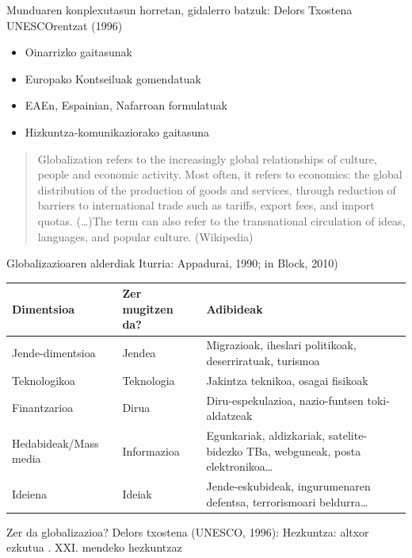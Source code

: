 \documentclass[
]{book}
\providecommand{\tightlist}{%
  \setlength{\itemsep}{0pt}\setlength{\parskip}{0pt}}
\begin{document}
Munduaren konplexutasun horretan, gidalerro batzuk: Delors Txostena UNESCOrentzat (1996)

\begin{itemize}
\tightlist
\item
  Oinarrizko gaitasunak
\item
  Europako Kontseiluak gomendatuak
\item
  EAEn, Espainian, Nafarroan formulatuak
\item
  Hizkuntza-komunikaziorako gaitasuna
\end{itemize}

\begin{quote}
Globalization refers to the increasingly global relationships of culture, people and economic activity. Most often, it refers to economics: the global distribution of the production of goods and services, through reduction of barriers to international trade such as tariffs, export fees, and import quotas. (\ldots)The term can also refer to the transnational circulation of ideas, languages, and popular culture. (Wikipedia)
\end{quote}

Globalizazioaren alderdiak
Iturria: Appadurai, 1990; in Block, 2010)

\begin{longtable}[]{@{}
  >{\raggedright\arraybackslash}p{}
  >{\raggedright\arraybackslash}p{}
  >{\raggedright\arraybackslash}p{}@{}}
\toprule
Dimentsioa & Zer mugitzen da? & Adibideak \\
\midrule
\endhead
Jende-dimentsioa & Jendea & Migrazioak, iheslari politikoak, deserriratuak, turismoa \\
Teknologikoa & Teknologia & Jakintza teknikoa, osagai fisikoak \\
Finantzarioa & Dirua & Diru-espekulazioa, nazio-funtsen toki-aldatzeak \\
Hedabideak/Mass media & Informazioa & Egunkariak, aldizkariak, satelite-bidezko TBa, webguneak, posta elektronikoa\ldots{} \\
Ideiena & Ideiak & Jende-eskubideak, ingurumenaren defentsa, terrorismoari beldurra\ldots{} \\
\bottomrule
\end{longtable}

Zer da globalizazioa? Delors txostena (UNESCO, 1996): Hezkuntza: altxor ezkutua . XXI. mendeko hezkuntzaz
\end{document}
